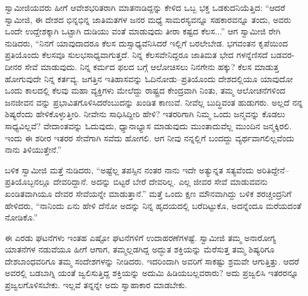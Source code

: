 ಸ್ವಾಮೀಜಿಯವರು ಹೀಗೆ ಆವೇಶಭರಿತರಾಗಿ ಮಾತನಾಡಿದ್ದನ್ನು ಕೇಳಿದ ಒಬ್ಬ ಭಕ್ತ ಒಡಕುದನಿಯೆತ್ತಿದ: “ಆದರೆ ಸ್ವಾಮೀಜಿ, ಈ ದೇಶದ ಭಿನ್ನಭಿನ್ನ ಜಾತಿಮತಗಳ ಜನರ ಮಧ್ಯೆ ಸಾಮರಸ್ಯವನ್ನೂ ಸಹಕಾರವನ್ನೂ ತಂದು, ಅವರು ಒಂದೇ ಉದ್ದೇಶಕ್ಕಾಗಿ ಒಟ್ಟಾಗಿ ದುಡಿಯು ವಂತೆ ಮಾಡುವುದು ತೀರಾ ಕಷ್ಟದ ಕೆಲಸ...” ಆಗ ಸ್ವಾಮೀಜಿ ರೇಗಿ ನುಡಿದರು, “ನಿನಗೆ ಯಾವುದಾದರೂ ಕೆಲಸ ದುಸ್ಸಾಧ್ಯವೆನಿಸಿದರೆ ಇಲ್ಲಿಗೆ ಬರಲೇಬೇಡ. ಭಗವಂತನ ಕೃಪೆಯಿಂದ ಪ್ರತಿಯೊಂದು ಕೆಲಸವೂ ಸುಲಭಸಾಧ್ಯವಾಗುತ್ತದೆ. ನಿನ್ನ ಕೆಲಸವೇನಿದ್ದರೂ ಜಾತಿಮತ ಭೇದ ಗಳನ್ನೆಣಿಸದೆ ಬಡವರ-ದೀನರ ಸೇವೆ ಮಾಡುವುದು. ನಿನ್ನ ಕರ್ಮದ ಫಲದ ಬಗ್ಗೆ ಆಲೋಚಿಸಲು ನಿನಗೇನು ಹಕ್ಕು? ಕೆಲಸ ಮಾಡುತ್ತ ಹೋಗುವುದೇ ನಿನ್ನ ಕರ್ತವ್ಯ. ಜಗತ್ತಿನ ಇತಿಹಾಸವನ್ನು ಓದಿನೋಡು–ಪ್ರತಿಯೊಂದು ದೇಶದಲ್ಲಿಯೂ ಯಾವುದೋ ಒಂದು ಕಾಲದಲ್ಲಿ ಕೆಲವು ಮಹಾ ವ್ಯಕ್ತಿಗಳು ಮೇಲೆದ್ದು ರಾಷ್ಟ್ರದ ಕೇಂದ್ರವಾಗಿ ನಿಂತು, ತಮ್ಮ ಆಲೋಚನೆಗಳಿಂದ ಜನಜೀವನ ವನ್ನು ಪ್ರಭಾವಿತಗೊಳಿಸಿದರೆಂಬುದನ್ನು ಖಂಡಿತ ಕಾಣುವೆ. ನೀವೆಲ್ಲ ಬುದ್ಧಿವಂತ ಹುಡುಗರು. ಅಲ್ಲದೆ ನನ್ನ ಶಿಷ್ಯರೆಂದು ಹೇಳಿಕೊಳ್ಳುತ್ತೀರಿ. ನೀವೇನು ಸಾಧಿಸಿದ್ದೀರಿ ಹೇಳಿ? ಇತರರಿಗಾಗಿ ನಿಮ್ಮ ಒಂದು ಜನ್ಮವನ್ನು ಕೊಡಲು ಸಾಧ್ಯವಿಲ್ಲವೆ? ವೇದಾಂತವನ್ನು ಓದುವುದು, ಧ್ಯಾನಾಭ್ಯಾಸ ಮಾಡುವುದು ಮುಂತಾದುವೆಲ್ಲ ಮುಂದಿನ ಜನ್ಮಕ್ಕಿರಲಿ. ಇಂದು ಈ ಶರೀರ ಇತರರ ಸೇವೆಗಾಗಿ ಸವೆದು ಹೋಗಲಿ. ಆಗ ನೀವು ನನ್ನಲ್ಲಿಗೆ ಬಂದದ್ದು ವ್ಯರ್ಥವಾಗಲಿಲ್ಲವೆಂದು ನಾನು ತಿಳಿಯುತ್ತೇನೆ.”

ಬಳಿಕ ಸ್ವಾಮೀಜಿ ಮತ್ತೆ ನುಡಿದರು, “ಅಷ್ಟೆಲ್ಲ ತಪಸ್ಸಿನ ನಂತರ ನಾನು ಇದೇ ಅತ್ಯುನ್ನತ ಸತ್ಯವೆಂದು ಅರಿತಿದ್ದೇನೆ–ಪ್ರತಿಯೊಬ್ಬನಲ್ಲೂ ದೇವರಿದ್ದಾನೆ. ಅದನ್ನು ಬಿಟ್ಟರೆ ಬೇರೆ ದೇವರಿಲ್ಲ. ಎಲ್ಲ ಜೀವರ ಸೇವೆ ಮಾಡುವವನು ಖಂಡಿತವಾಗಿಯೂ ದೇವರ ಸೇವೆಯನ್ನೇ ಮಾಡುತ್ತಾನೆ.” ಮತ್ತೆ ಒಂದು ಕ್ಷಣ ಮೌನವಾಗಿದ್ದು ಬಳಿಕ ಶರಚ್ಚಂದ್ರನಿಗೆ ಹೇಳಿದರು, “ನಾನಿಂದು ಏನು ಹೇಳಿ ದೆನೋ ಅದನ್ನು ನಿನ್ನ ಹೃದಯದಲ್ಲಿ ಬರೆದಿಟ್ಟುಕೊ, ಅದನ್ನೆಂದೂ ಮರೆಯದಂತೆ ನೋಡಿಕೊ.”

ಈ ಎರಡು ಘಟನೆಗಳು ಇಂತಹ ಎಷ್ಟೋ ಘಟನೆಗಳಿಗೆ ಉದಾಹರಣೆಗಳಷ್ಟೆ. ಸ್ವಾಮೀಜಿ ತಮ್ಮ ಅನಾರೋಗ್ಯ ಯಾತನೆಗಳ ನಡುವೆಯೂ ಹೀಗೆ ಆಗಾಗ, ತಮ್ಮಲ್ಲಡಗಿದ್ದ ಅದ್ಭುತ ಶಕ್ತಿಯನ್ನು ಮೆರೆಸುತ್ತ ತಮ್ಮ ಶಿಷ್ಯರಿಗೂ ದೇಶಬಾಂಧವರಿಗೂ ತಮ್ಮ ಸಂದೇಶಗಳನ್ನು ನೀಡಿದರು. ಇದರಿಂದಾಗಿ ಅವರಿಗೆ ಸಾಕಷ್ಟು ಶ್ರಮವೇ ಆಗುತ್ತಿತ್ತು. ಆದರೆ ಅವರಲ್ಲಿ ಬಡಬಾಗ್ನಿ ಯಂತೆ ಜ್ವಲಿಸುತ್ತಿದ್ದ ಶಕ್ತಿಯನ್ನು ಅದುಮಿ ಹಿಡಿಯಬಲ್ಲವರಾರು? ಅದು ಪ್ರಜ್ವಲಿಸಿ ಇತರರನ್ನೂ ಪ್ರಜ್ವಲಗೊಳಿಸಬೇಕು. ಇಲ್ಲವೆ ತನ್ನನ್ನೇ ಅದು ಸ್ವಾಹಾಕಾರ ಮಾಡಬೇಕು.

